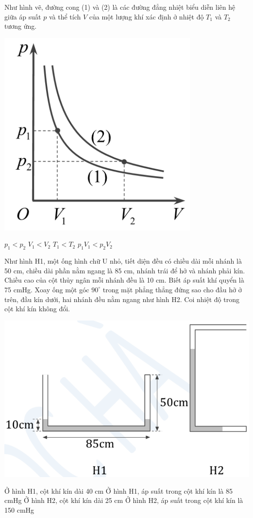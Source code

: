 \documentclass[12pt,a4paper]{article}
\begin{document}
\begin{ex}
	Như hình vẽ, đường cong (1) và (2) là các đường đẳng nhiệt biểu diễn liên hệ giữa áp suất $p$ và thể tích $V$ của một lượng khí xác định ở nhiệt độ $T_1$ và $T_2$ tương ứng.
	\begin{center}
		\includegraphics[scale=0.4]{img/9.png}
	\end{center}
	\choiceTF
	{$p_1 < p_2$}
	{$V_1 < V_2$}
	{$T_1 < T_2$}
	{$p_1V_1 < p_2V_2$}
 
\end{ex}

\begin{ex}
	Như hình H1, một ống hình chữ U nhỏ, tiết diện đều có chiều dài mỗi nhánh là 50 cm, chiều dài phần nằm ngang là 85 cm, nhánh trái để hở và nhánh phải kín. Chiều cao của cột thủy ngân mỗi nhánh đều là 10 cm. Biết áp suất khí quyển là 75 cmHg. Xoay ống một góc $90^\circ$ trong mặt phẳng thẳng đứng sao cho đầu hở ở trên, đầu kín dưới, hai nhánh đều nằm ngang như hình H2. Coi nhiệt độ trong cột khí kín không đổi.
		\begin{center}
		\includegraphics[scale=0.4]{img/10.png}
	\end{center}
	\choiceTF
	{Ở hình H1, cột khí kín dài 40 cm}
	{Ở hình H1, áp suất trong cột khí kín là 85 cmHg}
	{Ở hình H2, cột khí kín dài 25 cm}
	{Ở hình H2, áp suất trong cột khí kín là 150 cmHg}
\end{ex}
\end{document}
